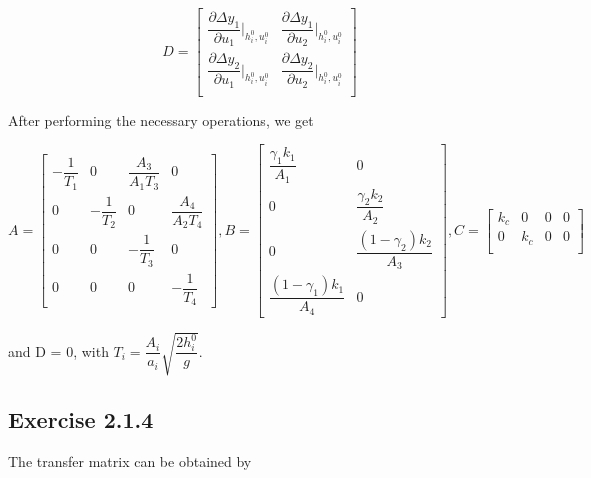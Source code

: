 \[
D =
\begin{bmatrix}
  \dfrac{\partial \Delta y_1}{\partial u_1} \bigg|_{h_i^0, u_i^0} &
  \dfrac{\partial \Delta y_1}{\partial u_2} \bigg|_{h_i^0, u_i^0} \\

  \dfrac{\partial \Delta y_2}{\partial u_1} \bigg|_{h_i^0, u_i^0} &
  \dfrac{\partial \Delta y_2}{\partial u_2} \bigg|_{h_i^0, u_i^0} \\
\end{bmatrix}
\]

After performing the necessary operations, we get

\[
A =
\begin{bmatrix}
  -\dfrac{1}{T_1} & 0 & \dfrac{A_3}{A_1 T_3} & 0  \\
  0 & -\dfrac{1}{T_2} & 0 & \dfrac{A_4}{A_2 T_4}  \\
  0 & 0 & -\dfrac{1}{T_3} & 0 \\
  0 & 0 & 0 & -\dfrac{1}{T_4}
\end{bmatrix},
B =
\begin{bmatrix}
  \dfrac{\gamma_1 k_1}{A_1} & 0 \\
  0 & \dfrac{\gamma_2 k_2}{A_2} \\
  0 & \dfrac{(1-\gamma_2) k_2}{A_3} \\
  \dfrac{(1-\gamma_1) k_1}{A_4} & 0
\end{bmatrix},
C =
\begin{bmatrix}
k_c & 0 & 0 & 0 \\
0 & k_c & 0 & 0 \\
\end{bmatrix}
\]

and D = 0, with $T_i = \dfrac{A_i}{a_i}\sqrt{\dfrac{2h_i^0}{g}}$.



\subsection*{Exercise 2.1.4}

The transfer matrix can be obtained by

